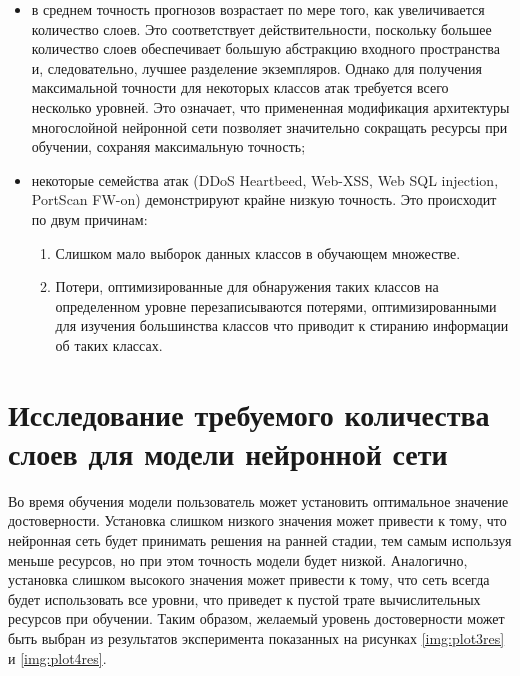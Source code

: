 \begin{itemize}
    \item в среднем точность прогнозов возрастает
    по мере того, как увеличивается количество слоев. Это соответствует действительности, 
    поскольку большее количество слоев обеспечивает большую абстракцию
    входного пространства и, следовательно, лучшее разделение экземпляров. Однако для получения максимальной
    точности для некоторых классов атак требуется всего несколько уровней. Это означает, что примененная модификация архитектуры 
    многослойной нейронной сети позволяет 
    значительно сокращать ресурсы при обучении, сохраняя максимальную точность;
    \item некоторые семейства атак (DDoS Heartbeed, Web-XSS, Web SQL injection, PortScan FW-on) демонстрируют крайне низкую точность. Это происходит по двум причинам:
        \begin{enumerate}
            \item Слишком мало выборок данных классов в обучающем множестве.
            \item Потери, оптимизированные для обнаружения таких классов на определенном уровне
                    перезаписываются потерями, оптимизированными для изучения большинства классов что приводит к стиранию информации об таких классах.
        \end{enumerate}
\end{itemize}


\section{Исследование требуемого количества слоев для модели нейронной сети}

Во время обучения модели пользователь может установить оптимальное значение достоверности. 
Установка слишком низкого значения может привести к тому, что нейронная сеть будет принимать решения 
на ранней стадии, тем самым используя меньше ресурсов, но при этом точность модели будет низкой.
Аналогично, установка слишком высокого значения может привести к тому, что сеть
всегда будет использовать все уровни, что приведет к пустой трате вычислительных ресурсов при обучении.
Таким образом, желаемый уровень достоверности может быть выбран из результатов эксперимента 
показанных на рисунках \ref*{img:plot3res} и \ref*{img:plot4res}.






